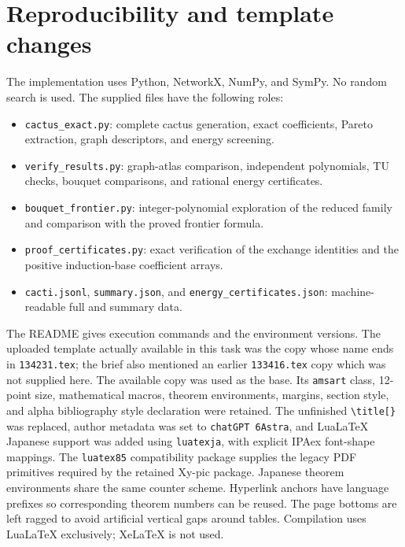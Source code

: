 \documentclass[12pt]{amsart}
\theoremstyle{definition}
\theoremstyle{remark}
\numberwithin{equation}{section}
\renewcommand{\theHsection}{en.\arabic{section}}
\begin{document}
\section{Reproducibility and template changes}
The implementation uses Python, NetworkX, NumPy, and SymPy. No random
search is used. The supplied files have the following roles:
\begin{itemize}
\item \texttt{cactus\_exact.py}: complete cactus generation, exact
coefficients, Pareto extraction, graph descriptors, and energy screening.
\item \texttt{verify\_results.py}: graph-atlas comparison, independent
polynomials, TU checks, bouquet comparisons, and rational energy certificates.
\item \texttt{bouquet\_frontier.py}: integer-polynomial exploration of the
reduced family and comparison with the proved frontier formula.
\item \texttt{proof\_certificates.py}: exact verification of the exchange
identities and the positive induction-base coefficient arrays.
\item \texttt{cacti.jsonl}, \texttt{summary.json}, and
\texttt{energy\_certificates.json}: machine-readable full and summary data.
\end{itemize}
The README gives execution commands and the environment versions.
The uploaded template actually available in this task was the copy whose
name ends in \texttt{134231.tex}; the brief also mentioned an earlier
\texttt{133416.tex} copy which was not supplied here. The available copy
was used as the base. Its \texttt{amsart} class, 12-point size, mathematical
macros, theorem environments, margins, section style, and alpha bibliography
style declaration were retained. The unfinished \verb|\title[}| was
replaced, author metadata was set to \texttt{chatGPT 6Astra}, and
LuaLaTeX Japanese support was added using \texttt{luatexja}, with explicit
IPAex font-shape mappings. The \texttt{luatex85} compatibility package
supplies the legacy PDF primitives required by the retained Xy-pic package. Japanese
theorem environments share the same counter scheme. Hyperlink anchors
have language prefixes so corresponding theorem numbers can be reused.
The page bottoms are left ragged to avoid artificial vertical gaps around tables.
Compilation uses LuaLaTeX exclusively; XeLaTeX is not used.

\appendix
\renewcommand{\theHsection}{en.appendix.\Alph{section}}
\end{document}
